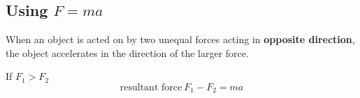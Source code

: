 \subsection{Using $F=ma$}

When an object is acted on by two unequal forces acting in \textbf{opposite direction}, the object accelerates in the direction of the larger force.

If $F_1>F_2$
$$\text{resultant force}\ F_1-F_2=ma$$
